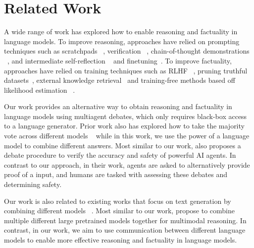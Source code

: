 \vspace{-8pt}
\section{Related Work}

 A wide range of work has explored how to enable reasoning and factuality in language models. To improve reasoning, approaches have relied on prompting techniques such as scratchpads ~\cite{nye2021show},  verification ~\cite{verifier}, chain-of-thought demonstrations ~\cite{wei2022chain,kojima2022large,reynolds2021prompt}, and intermediate self-reflection ~\cite{reflexion, madaan2023self} and finetuning~\cite{lewkowycz2022solving, rajani2019explain,zelikman2022star}. To improve factuality, approaches have relied on training techniques such as RLHF ~\citep{ziegler2019rlhf,liu2022instruction,christiano2017rlhf}, pruning truthful datasets~\citep{lee2022factuality}, external knowledge retrieval~\citep{guu2020realm} and training-free methods based off likelihood estimation ~\citep{kadavath2022language}.

Our work provides an alternative way to obtain reasoning and factuality in language models using multiagent debates, which only requires black-box access to a language generator. Prior work also has explored how to take the majority vote across different models ~\cite{alphacode,verifier,wang2022self,thoppilan2022lamda} while in this work, we use the power of a language model to combine different answers. Most similar to our work, \citet{irving2018ai} also proposes a debate procedure to verify the accuracy and safety of powerful AI agents. In contrast to our approach, in their work, agents are asked to alternatively provide proof of a input, and humans are tasked with assessing these debates and determining safety. 



 Our work is also related to existing works that focus on text generation by combining different models ~\cite{du2020compositional, liu2022compositional,zeng2022socratic,alayrac2022flamingo,du2023reduce}. Most similar to our work, \cite{li2022composing,zeng2022socratic} propose to combine multiple different large pretrained models together for multimodal reasoning.  In contrast, in our work, we aim to use communication between different language models to enable more effective reasoning and factuality in language models. 